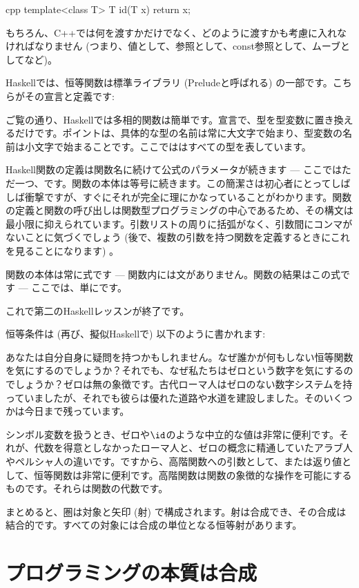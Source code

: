 \begin{snip}{cpp}
template<class T> T id(T x) { return x; }
\end{snip}
もちろん、C++では何を渡すかだけでなく、どのように渡すかも考慮に入れなければなりません (つまり、値として、参照として、const参照として、ムーブとしてなど)。

Haskellでは、恒等関数は標準ライブラリ (Preludeと呼ばれる) の一部です。こちらがその宣言と定義です:

ご覧の通り、Haskellでは多相的関数は簡単です。宣言で、型を型変数に置き換えるだけです。ポイントは、具体的な型の名前は常に大文字で始まり、型変数の名前は小文字で始まることです。ここでははすべての型を表しています。

Haskell関数の定義は関数名に続けて公式のパラメータが続きます --- ここではただ一つ、です。関数の本体は等号に続きます。この簡潔さは初心者にとってしばしば衝撃ですが、すぐにそれが完全に理にかなっていることがわかります。関数の定義と関数の呼び出しは関数型プログラミングの中心であるため、その構文は最小限に抑えられています。引数リストの周りに括弧がなく、引数間にコンマがないことに気づくでしょう (後で、複数の引数を持つ関数を定義するときにこれを見ることになります) 。

関数の本体は常に式です --- 関数内には文がありません。関数の結果はこの式です --- ここでは、単にです。

これで第二のHaskellレッスンが終了です。

恒等条件は (再び、擬似Haskellで) 以下のように書かれます:

あなたは自分自身に疑問を持つかもしれません。なぜ誰かが何もしない恒等関数を気にするのでしょうか？それでも、なぜ私たちはゼロという数字を気にするのでしょうか？ゼロは無の象徴です。古代ローマ人はゼロのない数字システムを持っていましたが、それでも彼らは優れた道路や水道を建設しました。そのいくつかは今日まで残っています。

シンボル変数を扱うとき、ゼロや$\id$のような中立的な値は非常に便利です。それが、代数を得意としなかったローマ人と、ゼロの概念に精通していたアラブ人やペルシャ人の違いです。ですから、高階関数への引数として、または返り値として、恒等関数は非常に便利です。高階関数は関数の象徴的な操作を可能にするものです。それらは関数の代数です。

まとめると、圏は対象と矢印 (射) で構成されます。射は合成でき、その合成は結合的です。すべての対象には合成の単位となる恒等射があります。

\section{プログラミングの本質は合成}

